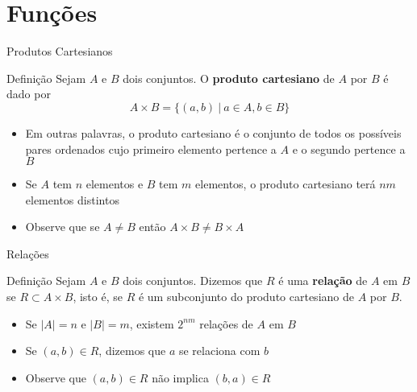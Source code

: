 \section*{Funções}

\begin{frame}[fragile]{Produtos Cartesianos}

    \begin{block}{Definição}
        Sejam $A$ e $B$ dois conjuntos.  O \textbf{produto cartesiano} de $A$ por $B$ é dado por
$$
A\times B = \{(a, b)\ |\ a \in A, b\in B\}
$$
    \end{block}

    \vspace{0.2in}

    \begin{itemize}
        \item Em outras palavras, o produto cartesiano é o conjunto de todos os possíveis pares ordenados cujo primeiro elemento pertence a $A$ e o segundo pertence a $B$

        \item Se $A$ tem $n$ elementos e $B$ tem $m$ elementos, o produto cartesiano terá $nm$ elementos distintos

        \item Observe que se $A \neq B$ então $A\times B \neq B\times A$
    \end{itemize}

\end{frame}

\begin{frame}[fragile]{Relações}

    \begin{block}{Definição}
        Sejam $A$ e $B$ dois conjuntos. Dizemos que $R$ é uma \textbf{relação} de $A$ em $B$ se $R \subset A\times B$, isto é, se $R$ é um subconjunto do
            produto cartesiano de $A$ por $B$.
    \end{block}

    \vspace{0.2in}

    \begin{itemize}
        \item Se $|A| = n$ e $|B| = m$, existem $2^{nm}$ relações de $A$ em $B$

        \item Se $(a,b) \in R$, dizemos que $a$ se relaciona com $b$

        \item Observe que $(a, b)\in R$ não implica $(b, a)\in R$
    \end{itemize}

\end{frame}

